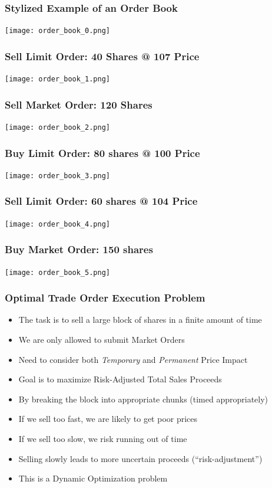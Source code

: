 \documentclass{beamer}
\begin{document}
\begin{frame}
\frametitle{Stylized Example of an Order Book}
\texttt{[image: order\_book\_0.png]}
\end{frame}

\begin{frame}
\frametitle{Sell Limit Order: 40 Shares @ 107 Price}
\texttt{[image: order\_book\_1.png]}
\end{frame}

\begin{frame}
\frametitle{Sell Market Order: 120 Shares}
\texttt{[image: order\_book\_2.png]}
\end{frame}

\begin{frame}
\frametitle{Buy Limit Order: 80 shares @ 100 Price}
\texttt{[image: order\_book\_3.png]}
\end{frame}

\begin{frame}
\frametitle{Sell Limit Order: 60 shares @ 104 Price}
\texttt{[image: order\_book\_4.png]}
\end{frame}

\begin{frame}
\frametitle{Buy Market Order: 150 shares}
\texttt{[image: order\_book\_5.png]}
\end{frame}

\begin{frame}
\frametitle{Optimal Trade Order Execution Problem}
\pause
\begin{itemize}[<+->]
\item The task is to sell a large block of shares in a finite amount of time
\item We are only allowed to submit Market Orders
\item Need to consider both {\em Temporary} and {\em Permanent} Price Impact
\item Goal is to maximize Risk-Adjusted Total Sales Proceeds
\item By breaking the block into appropriate chunks (timed appropriately)
\item If we sell too fast, we are likely to get poor prices
\item If we sell too slow, we risk running out of time
\item Selling slowly leads to more uncertain proceeds (``risk-adjustment'')
\item This is a Dynamic Optimization problem
\end{itemize}
\end{frame}
\end{document}
